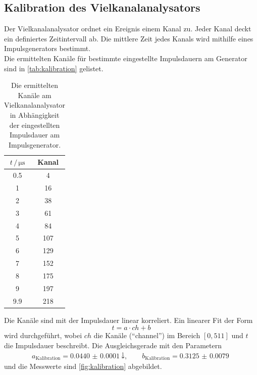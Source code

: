 \subsection{Kalibration des Vielkanalanalysators}
Der Vielkanalanalysator ordnet ein Ereignis einem Kanal zu.
Jeder Kanal deckt ein definiertes Zeitintervall ab.
Die mittlere Zeit jedes Kanals wird mithilfe eines Impulsgenerators bestimmt.
\\
Die ermittelten Kanäle für bestimmte eingestellte Impulsdauern am Generator sind in \autoref{tab:kalibration} gelistet.
\begin{table}
    \centering
    \caption{Die ermittelten Kanäle am Vielkanalanalysator in Abhängigkeit der eingestellten Impulsdauer am Impulsgenerator.}
    \label{tab:kalibration}
    \begin{tabular}{cc}
        \toprule
        $t \,/\, \unit{\micro\second}$ & Kanal \\
        \midrule
        0.5 & 4 \\
        1 & 16 \\
        2 & 38 \\
        3 & 61 \\
        4 & 84 \\
        5 & 107 \\
        6 & 129 \\
        7 & 152 \\
        8 & 175 \\
        9 & 197 \\
        9.9 & 218 \\
        \bottomrule
    \end{tabular}
\end{table}
Die Kanäle sind mit der Impulsdauer linear korreliert.
Ein linearer Fit der Form
\begin{equation*}
    t = a \cdot ch + b
\end{equation*}
wird durchgeführt, wobei $ch$ die Kanäle ("`channel"') im Bereich $[0, 511]$ und $t$ die Impulsdauer beschreibt.
Die Ausgleichsgerade mit den Parametern
\begin{align*}
    a_\text{Kalibration} = \qty{0.0440(00001)}{\frac{1}{\second}}, \qquad b_\text{Kalibration} = \qty{0.3125(00079)}{}
\end{align*}
und die Messwerte sind \autoref{fig:kalibration} abgebildet.
